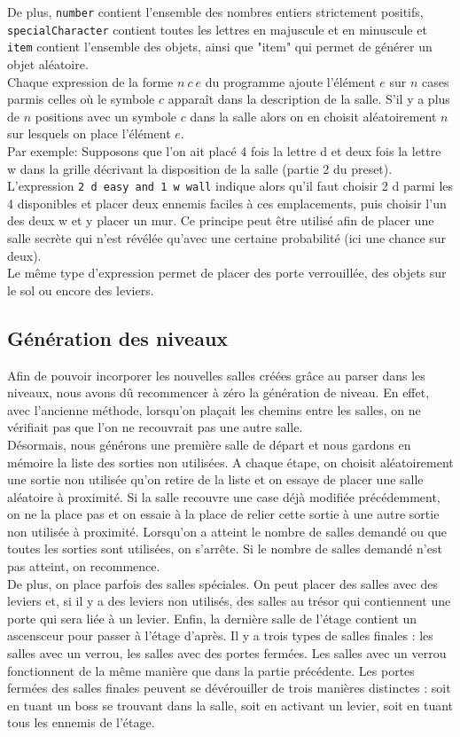 \documentclass[10pt,a4paper]{article}
\begin{document}
De plus, \texttt{number} contient l'ensemble des nombres entiers strictement positifs, \texttt{specialCharacter} contient toutes les lettres en majuscule et en minuscule et \texttt{item} contient l'ensemble des objets, ainsi que "item" qui permet de générer un objet aléatoire.\\
Chaque expression de la forme $n\ c\ e$ du programme ajoute l'élément $e$ sur $n$ cases parmis celles où le symbole $c$ apparaît dans la description de la salle. S'il y a plus de $n$ positions avec un symbole $c$ dans la salle alors on en choisit aléatoirement $n$ sur lesquels on place l'élément $e$.\\
Par exemple: Supposons que l'on ait placé 4 fois la lettre d et deux fois la lettre w dans la grille décrivant la disposition de la salle (partie 2 du preset). L'expression \texttt{2 d easy and 1 w wall} indique alors qu'il faut choisir 2 d parmi les 4 disponibles et placer deux ennemis faciles à ces emplacements, puis choisir l'un des deux w et y placer un mur. Ce principe peut être utilisé afin de placer une salle secrète qui n'est révélée qu'avec une certaine probabilité (ici une chance sur deux).\\
Le même type d'expression permet de placer des porte verrouillée, des objets sur le sol ou encore des leviers.

\subsection{Génération des niveaux}

Afin de pouvoir incorporer les nouvelles salles créées grâce au parser dans les niveaux, nous avons dû recommencer à zéro la génération de niveau. En effet, avec l'ancienne méthode, lorsqu'on plaçait les chemins entre les salles, on ne vérifiait pas que l'on ne recouvrait pas une autre salle.\\
Désormais, nous générons une première salle de départ et nous gardons en mémoire la liste des sorties non utilisées. A chaque étape, on choisit aléatoirement une sortie non utilisée qu'on retire de la liste et on essaye de placer une salle aléatoire à proximité. Si la salle recouvre une case déjà modifiée précédemment, on ne la place pas et on essaie à la place de relier cette sortie à une autre sortie non utilisée à proximité. Lorsqu'on a atteint le nombre de salles demandé ou que toutes les sorties sont utilisées, on s'arrête. Si le nombre de salles demandé n'est pas atteint, on recommence.\\
De plus, on place parfois des salles spéciales. On peut placer des salles avec des leviers et, si il y a des leviers non utilisés, des salles au trésor qui contiennent une porte qui sera liée à un levier. Enfin, la dernière salle de l'étage contient un ascensceur pour passer à l'étage d'après. Il y a trois types de salles finales : les salles avec un verrou, les salles avec des portes fermées. Les salles avec un verrou fonctionnent de la même manière que dans la partie précédente. Les portes fermées des salles finales peuvent se dévérouiller de trois manières distinctes : soit en tuant un boss se trouvant dans la salle, soit en activant un levier, soit en tuant tous les ennemis de l'étage.\\
\end{document}
